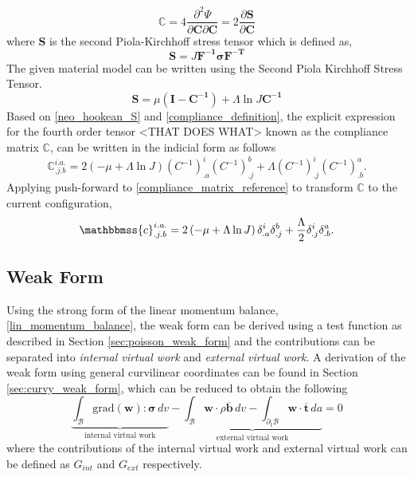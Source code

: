 \documentclass[../main.tex]{subfiles}
\begin{document}
\begin{equation} \label{compliance_definition}
    {\mathbb{C} = 4\frac{\partial^2 \Psi}{\partial\boldsymbol{C}\partial\boldsymbol{C}} = 2\frac{\partial\boldsymbol{S}}{\partial\boldsymbol{C}}}
\end{equation}
 where \textbf{S} is the second Piola-Kirchhoff stress tensor which is defined as,
\begin{equation}\label{eq:19}
    {\boldsymbol{S} = J \boldsymbol{F^{-1} \sigma F^{-T}}}
\end{equation}
The given material model can be written using the Second Piola Kirchhoff Stress Tensor.
\begin{equation}\label{neo_hookean_S}
    {\boldsymbol{S} = \mu\left(\boldsymbol{I} - \boldsymbol{C^{-1}}\right) + \Lambda\ln{J}\boldsymbol{C^{-1}}}
\end{equation}
Based on \eqref{neo_hookean_S} and \eqref{compliance_definition}, the explicit expression for the fourth order tensor <THAT DOES WHAT> known as
 the compliance matrix $\mathbb{C}$, can be written in the indicial form as follows
\begin{equation}\label{compliance_matrix_reference}
    \mathbb{C}^{i.a.}_{.j.b} = 2\left(-\mu + \Lambda\ln{J}\right)\left(C^{-1}\right)^i_{.a} \left(C^{-1}\right)^b_{.j} + \Lambda \left(C^{-1}\right)^i_{.j} \left(C^{-1}\right)^a_{.b}.
\end{equation}
Applying push-forward to \eqref{compliance_matrix_reference} to transform $\mathbb{C}$ to the current configuration,
\begin{equation} \label{compliance_matrix_current}
    \mathbbmss{c}^{i.a.}_{.j.b} = 2\left(-\mu + \Lambda\ln{J}\right) \delta^i_{.a} \delta^b_{.j} + \frac{\Lambda}{2} \delta^i_{.j} \delta^a_{.b}.
\end{equation}

\subsection{Weak Form}
Using the strong form of the linear momentum balance, \eqref{lin_momentum_balance},
 the weak form can be derived using a test function as described in Section \ref{sec:poisson_weak_form} and the contributions can be 
 separated into \emph{internal virtual work} and \emph{external virtual work}. A derivation of the weak form using
 general curvilinear coordinates can be found in Section \ref{sec:curvy_weak_form}, which can be reduced to obtain the following 
\begin{equation} \label{weak_form_beam}
    \underbrace{\int_{\mathcal{B}} \mathrm{grad}(\boldsymbol{w}) : \boldsymbol{\sigma} \,dv}_{\text{internal virtual work}} - 
        \underbrace{\int_{\mathcal{B}} \boldsymbol{w}\cdot \rho \overline{\boldsymbol{b}} \,dv - \int_{\partial_{t}\mathcal{B}} \boldsymbol{w} \cdot \overline{\boldsymbol{t}} \,da}_{\text{external virtual work}} = 0
\end{equation}
where the contributions of the internal virtual work and external virtual work can be defined as $G_{int}$ and $G_{ext}$ respectively.
\end{document}
